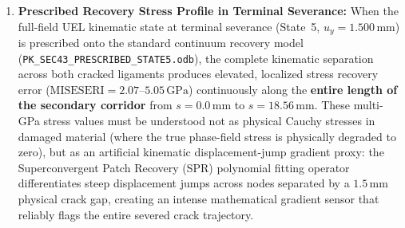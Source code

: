 \begin{enumerate}
  \item \textbf{Prescribed Recovery Stress Profile in Terminal Severance:}
  When the full-field UEL kinematic state at terminal severance (State~5, $u_y = 1.500\,\mathrm{mm}$) is prescribed onto the standard continuum recovery model (\texttt{PK\_SEC43\_PRESCRIBED\_STATE5.odb}), the complete kinematic separation across both cracked ligaments produces elevated, localized stress recovery error ($\mathrm{MISESERI} = 2.07$--$5.05\,\mathrm{GPa}$) continuously along the \textbf{entire length of the secondary corridor} from $s = 0.0\,\mathrm{mm}$ to $s = 18.56\,\mathrm{mm}$. These multi-GPa stress values must be understood not as physical Cauchy stresses in damaged material (where the true phase-field stress is physically degraded to zero), but as an artificial kinematic displacement-jump gradient proxy: the Superconvergent Patch Recovery (SPR) polynomial fitting operator differentiates steep displacement jumps across nodes separated by a $1.5\,\mathrm{mm}$ physical crack gap, creating an intense mathematical gradient sensor that reliably flags the entire severed crack trajectory.
\end{enumerate}

